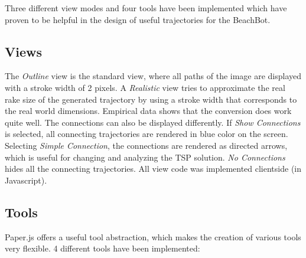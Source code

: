 Three different view modes and four tools have been implemented which have proven to be helpful in the design of useful trajectories for the BeachBot.

\subsection{Views} The \textit{Outline} view is the standard view, where all paths of the image are displayed with a stroke width of 2 pixels. A \textit{Realistic} view tries to approximate the real rake size of the generated trajectory by using a stroke width that corresponds to the real world dimensions. Empirical data shows that the conversion does work quite well. The connections can also be displayed differently. If \textit{Show Connections} is selected, all connecting trajectories are rendered in blue color on the screen. Selecting \textit{Simple Connection}, the connections are rendered as directed arrows, which is useful for changing and analyzing the TSP solution. \textit{No Connections} hides all the connecting trajectories. All view code was implemented clientside (in Javascript).

\subsection{Tools}

Paper.js offers a useful tool abstraction, which makes the creation of various tools very flexible. 4 different tools have been implemented:

